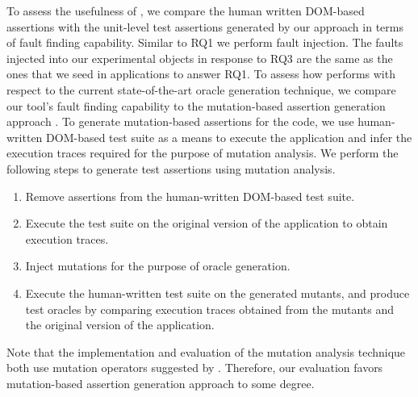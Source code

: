  To assess the usefulness of \tool, we compare the human written DOM-based assertions with the unit-level test assertions generated by our approach in terms of fault finding capability.
Similar to RQ1 we perform fault injection.
The faults injected into our experimental objects in response to RQ3 are the same as the ones that we seed in applications to answer RQ1.
 To assess how \tool performs with respect to the current state-of-the-art oracle generation technique, we compare our tool's fault finding capability to the mutation-based assertion generation approach \cite{mirshokraie:icst15, fraser:tse12}. To generate mutation-based assertions for the \javascript code, we use human-written DOM-based test suite as a means to execute the application and infer the execution traces required for the purpose of mutation analysis. We perform the following steps to generate test assertions using mutation analysis.
\begin{enumerate}
\item Remove assertions from the human-written DOM-based test suite.
\item Execute the test suite on the original version of the application to obtain execution traces.
\item Inject mutations for the purpose of oracle generation.
\item Execute the human-written test suite on the generated mutants, and produce test oracles by comparing execution traces obtained from the mutants and the original version of the application.
\end{enumerate}
Note that the implementation and evaluation of the mutation analysis technique both use mutation operators suggested by \cite{mirshokraie:tse15}. Therefore, our evaluation favors mutation-based assertion generation approach to some degree.

 

